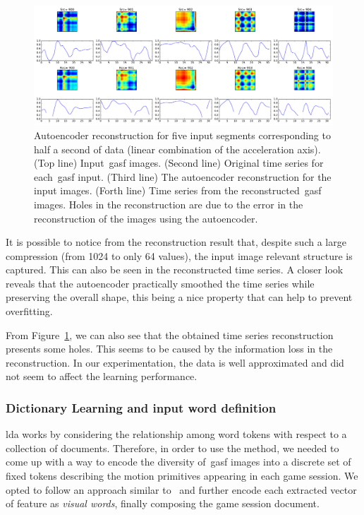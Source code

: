 \begin{figure}[h]
	\centering
	\includegraphics[width=\textwidth]{images/05-modeling/reconstructions}
	\caption{Autoencoder reconstruction for five input segments corresponding to half a second of data (linear combination of the acceleration axis). ({Top line}) Input~\gls{gasf} images. ({Second line}) Original time series for each~\gls{gasf} input. ({Third line}) The autoencoder reconstruction for the input images. ({Forth line}) Time series from the reconstructed~\gls{gasf} images. Holes in the reconstruction are due to the error in the reconstruction of the images using the autoencoder.}
  \label{fig:reconstruction}
\end{figure}

It is possible to notice from the reconstruction result that, despite such a large compression (from 1024 to only 64 values), the input image relevant structure is captured. This can also be seen in the reconstructed time series. A closer look reveals that the autoencoder practically smoothed the time series while preserving the overall shape, this being a nice property that can help to prevent overfitting.

From Figure~\ref{fig:reconstruction}, we can also see that the obtained time series reconstruction presents some holes. This seems to be caused by the information loss in the reconstruction. In our experimentation, the data is well approximated and did not seem to affect the learning performance.%

\subsubsection{Dictionary Learning and input word definition}
\glsdesc{lda} works by considering the relationship among word tokens with respect to a collection of documents. Therefore, in order to use the method, we needed to come up with a way to encode the diversity of~\gls{gasf} images into a discrete set of fixed tokens describing the motion primitives appearing in each game session. We opted to follow an approach similar to~\cite{prince_computer_2012} and further encode each extracted vector of feature as \textit{visual words}, finally composing the game session document. 

